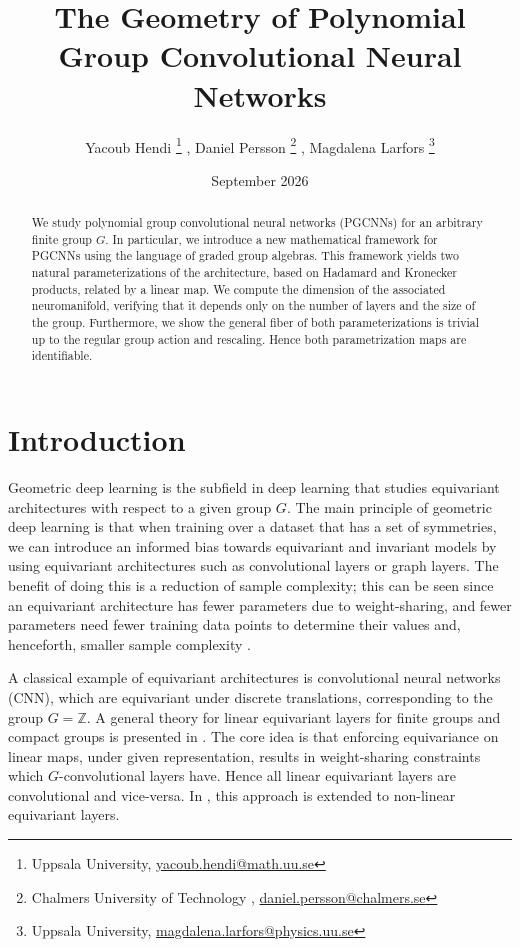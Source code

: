 \documentclass[final]{article}
\title{The Geometry of Polynomial Group Convolutional Neural Networks}
\author{Yacoub Hendi \thanks{Uppsala University, \url{yacoub.hendi@math.uu.se}} , 
Daniel Persson \thanks{Chalmers University of Technology , \url{daniel.persson@chalmers.se}} , 
Magdalena Larfors \thanks{Uppsala University, \url{magdalena.larfors@physics.uu.se}}}
\date{September 2026}
\theoremstyle{definition}
\theoremstyle{plain}
\begin{document}
\maketitle


\begin{abstract}
\noindent We study polynomial group convolutional neural networks (PGCNNs) for an arbitrary finite group 
$G$. In particular, we introduce a new mathematical framework for PGCNNs using the language of graded group algebras. This framework yields two natural parameterizations of the architecture, based on Hadamard and Kronecker products, related by a linear map. 
We compute the dimension of the associated neuromanifold, verifying that it depends only on the number of layers and the size of the group. Furthermore, we show the general fiber of both parameterizations is trivial up to the regular group action and rescaling. Hence both parametrization maps are identifiable.
\end{abstract}

\tableofcontents

\section{Introduction}

Geometric deep learning \cite{7974879, bronstein2021geometricdeeplearninggrids, Gerken2023} is the subfield in deep learning that studies equivariant architectures with respect to a given group $G$. 
The main principle of geometric deep learning is that when training over a dataset that has a set of symmetries, we can introduce an informed bias towards equivariant and invariant models by using equivariant architectures such as convolutional layers or graph layers. 
The benefit of doing this is a reduction of sample complexity; this can be seen since an equivariant architecture has fewer parameters due to weight-sharing, and fewer parameters need fewer training data points to determine their values and, henceforth, smaller sample complexity \cite{NEURIPS2018_03c6b069}. 

A classical example of equivariant architectures is convolutional neural networks (CNN), which are equivariant under discrete translations, corresponding to the group $G=\mathbb{Z}$.
A general theory for linear equivariant layers for finite groups and compact groups is presented in \cite{pmlr-v48-cohenc16, 10.5555/3454287.3455107}.
The core idea is that enforcing equivariance on linear maps, under given representation, results in weight-sharing constraints which $G$-convolutional layers have.
Hence all linear equivariant layers are convolutional and vice-versa.
In \cite{nyholm2025equivariantnonlinearmapsneural}, this approach is extended to non-linear equivariant layers.
\end{document}
